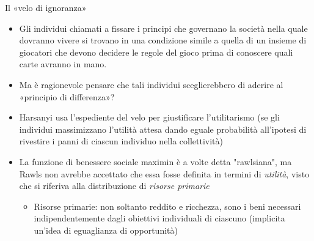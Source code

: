 \documentclass[aspectratio=64,11pt]{beamer}
\begin{document}
\begin{frame}{Il «velo di ignoranza»}
\begin{itemize}
\item Gli individui chiamati a fissare i principi che governano la società nella
quale dovranno vivere si trovano in una condizione simile a quella di un
insieme di giocatori che devono decidere le regole del gioco prima di
conoscere quali carte avranno in mano.
\item Ma è ragionevole pensare che tali individui sceglierebbero di aderire al
«principio di differenza»?
\item Harsanyi usa l'espediente del velo per giustificare l'utilitarismo (se gli
individui massimizzano l'utilità attesa dando eguale probabilità all'ipotesi
di rivestire i panni di ciascun individuo nella collettività)

\item La funzione di benessere sociale maximin è a volte detta "rawlsiana", ma
Rawls non avrebbe accettato che essa fosse definita in termini di \emph{utilità},
visto che si riferiva alla distribuzione di \emph{risorse primarie}
\begin{itemize}
\item Risorse primarie: non soltanto reddito e ricchezza, sono i beni necessari
indipendentemente dagli obiettivi individuali di ciascuno (implicita
un'idea di eguaglianza di opportunità)
\end{itemize}
\end{itemize}
\end{frame}
\end{document}
